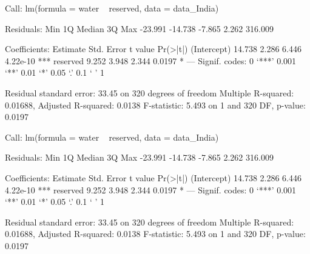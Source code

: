 Call:
lm(formula = water ~ reserved, data = data_India)

Residuals:
    Min      1Q  Median      3Q     Max 
-23.991 -14.738  -7.865   2.262 316.009 

Coefficients:
            Estimate Std. Error t value Pr(>|t|)    
(Intercept)   14.738      2.286   6.446 4.22e-10 ***
reserved       9.252      3.948   2.344   0.0197 *  
---
Signif. codes:  0 ‘***’ 0.001 ‘**’ 0.01 ‘*’ 0.05 ‘.’ 0.1 ‘ ’ 1

Residual standard error: 33.45 on 320 degrees of freedom
Multiple R-squared:  0.01688,	Adjusted R-squared:  0.0138 
F-statistic: 5.493 on 1 and 320 DF,  p-value: 0.0197


Call:
lm(formula = water ~ reserved, data = data_India)

Residuals:
    Min      1Q  Median      3Q     Max 
-23.991 -14.738  -7.865   2.262 316.009 

Coefficients:
            Estimate Std. Error t value Pr(>|t|)    
(Intercept)   14.738      2.286   6.446 4.22e-10 ***
reserved       9.252      3.948   2.344   0.0197 *  
---
Signif. codes:  0 ‘***’ 0.001 ‘**’ 0.01 ‘*’ 0.05 ‘.’ 0.1 ‘ ’ 1

Residual standard error: 33.45 on 320 degrees of freedom
Multiple R-squared:  0.01688,	Adjusted R-squared:  0.0138 
F-statistic: 5.493 on 1 and 320 DF,  p-value: 0.0197

